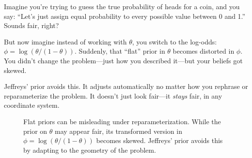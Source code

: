 Imagine you’re trying to guess the true probability of heads for a coin, and you say: “Let’s just assign equal probability to every possible value between 0 and 1.” Sounds fair, right?

But now imagine instead of working with \( \theta \), you switch to the log-odds: \( \phi = \log(\theta / (1 - \theta)) \). Suddenly, that “flat” prior in \( \theta \) becomes distorted in \( \phi \). You didn’t change the problem—just how you described it—but your beliefs got skewed.

Jeffreys’ prior avoids this. It adjusts automatically no matter how you rephrase or reparameterize the problem. It doesn’t just look fair—it \textit{stays} fair, in any coordinate system.


\begin{figure}[H]
\centering
{}
\caption{Flat priors can be misleading under reparameterization. While the prior on \( \theta \) may appear fair, its transformed version in \( \phi = \log(\theta / (1 - \theta)) \) becomes skewed. Jeffreys’ prior avoids this by adapting to the geometry of the problem.}
\end{figure}




